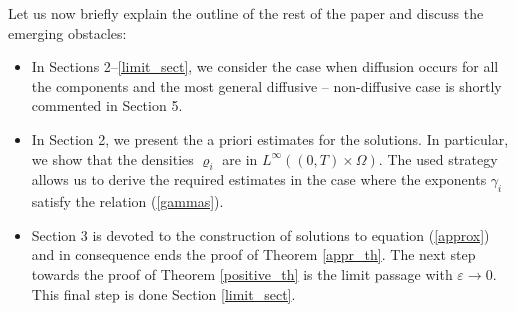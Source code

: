 \documentclass[11pt]{article}
\numberwithin{equation}{section}
\numberwithin{tw}{section}
\begin{document}
Let us now briefly explain the outline of the rest of the paper and discuss the emerging obstacles:
\begin{itemize}
    \item In Sections 2--\ref{limit_sect}, we consider the case when diffusion occurs for all the components and the most general diffusive -- non-diffusive case is shortly commented in Section 5.
    \item In Section 2, we present the a priori estimates for the solutions. In particular, we show that the densities $\varrho_i$ are in $L^\infty((0,T)\times\Omega)$. The used strategy allows us to derive the required estimates in the case where the exponents $\gamma_i$ satisfy the relation (\ref{gammas}).
    \item Section 3 is devoted to the construction of solutions to equation (\ref{approx}) and in consequence ends the proof of Theorem \ref{appr_th}.
    The next step towards the proof of Theorem \ref{positive_th} is the limit passage with $\varepsilon\to 0$. This final step is done Section \ref{limit_sect}.

    
\end{itemize}
\end{document}
